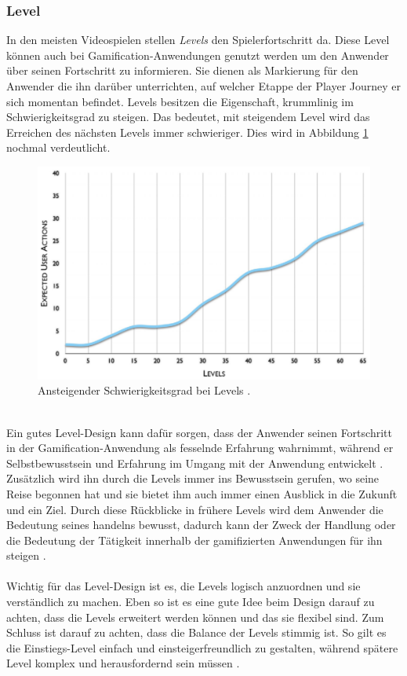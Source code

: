 \documentclass[a4paper,12pt]{scrartcl}
\begin{document}
\subsubsection{Level}
In den meisten Videospielen stellen \textit{Levels} den Spielerfortschritt da. Diese Level können auch bei Gamification-Anwendungen genutzt werden um den Anwender über seinen Fortschritt zu informieren. Sie dienen als Markierung für den Anwender die ihn darüber unterrichten, auf welcher Etappe der Player Journey er sich momentan befindet. Levels besitzen die Eigenschaft, krummlinig im Schwierigkeitsgrad zu steigen. Das bedeutet, mit steigendem Level wird das Erreichen des nächsten Levels immer schwieriger. Dies wird in Abbildung \ref{LevelkomplexitätBild} nochmal verdeutlicht.
\\
\begin{figure}[h!]
\begin{center}
\includegraphics[scale = 0.7]{Bilder/Levels.eps}
\caption{Ansteigender Schwierigkeitsgrad bei Levels \cite{Zichermann2011}.}
\label{LevelkomplexitätBild}
\end{center}
\end{figure} 
\\
Ein gutes Level-Design kann dafür sorgen, dass der Anwender seinen Fortschritt in der Gamification-Anwendung als fesselnde Erfahrung wahrnimmt, während er Selbstbewusstsein und Erfahrung im Umgang mit der Anwendung entwickelt \cite{Zichermann2011}. Zusätzlich wird ihn durch die Levels immer ins Bewusstsein gerufen, wo seine Reise begonnen hat und sie bietet ihm auch immer einen Ausblick in die Zukunft und ein Ziel. Durch diese Rückblicke in frühere Levels wird dem Anwender die Bedeutung seines handelns bewusst, dadurch kann der Zweck der Handlung oder die Bedeutung der Tätigkeit innerhalb der gamifizierten Anwendungen für ihn steigen \cite{Zichermann2011}.
\\\\
Wichtig für das Level-Design ist es, die Levels logisch anzuordnen und sie verständlich zu machen. Eben so ist es eine gute Idee beim Design darauf zu achten, dass die Levels erweitert werden können und das sie flexibel sind. Zum Schluss ist darauf zu achten, dass die Balance der Levels stimmig ist. So gilt es die Einstiegs-Level einfach und einsteigerfreundlich zu gestalten, während spätere Level komplex und herausfordernd sein müssen \cite{Zichermann2011}.
\end{document}
